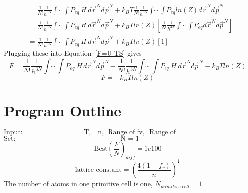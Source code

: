 \documentclass[double,12pt]{beavtex}
\begin{document}
\begin{align}  
    &= \frac{1}{N!}\frac{1}{h^{3N}}\int\dot~\dot~\dot~\int P_{eq}~H~d\vec r^{N} d\vec p^{N} +k_BT\frac{1}{N!}\frac{1}{h^{3N}}\int\dot~\dot~\dot~\int P_{eq}ln(Z)d\vec r^{N} d\vec p^{N}     \\
    &= \frac{1}{N!}\frac{1}{h^{3N}}\int\dot~\dot~\dot~\int P_{eq}~H~d\vec r^{N} d\vec p^{N} +k_BTln(Z)\left[\frac{1}{N!}\frac{1}{h^{3N}}\int\dot~\dot~\dot~\int P_{eq}d\vec r^{N} d\vec p^{N}\right]   \\
    &= \frac{1}{N!}\frac{1}{h^{3N}}\int\dot~\dot~\dot~\int P_{eq}~H~d\vec r^{N} d\vec p^{N} +k_BTln(Z)\left[1\right]   
\end{align}
Plugging these into Equation~\ref{F=U-TS} gives
\begin{equation} F = \frac{1}{N!}\frac{1}{h^{3N}}\int\dot~\dot~\dot~\int P_{eq}~H~d\vec r^{N} d\vec p^{N}-\frac{1}{N!}\frac{1}{h^{3N}}\int\dot~\dot~\dot~\int P_{eq}~H~d\vec r^{N} d\vec p^{N} -k_BTln(Z)\end{equation}
\begin{equation}F = -k_BTln(Z)\end{equation}


\section{Program Outline}

\begin{displaymath}\text{Input:~~~~~~~~~~~~~~~~~~~~~~~~~~~T,~~ n,~~Range of fv,~~Range of gw~~~~~~~~~~~~~~~~~~~~~~~~~~~~~~~~~~~}\end{displaymath} 
\begin{displaymath}\text{Set:~~~~~~~~~~~~~~~~~~~~~~~~~~~~~~~~~~~~~~~~~~~~~~N~=~1~~~~~~~~~~~~~~~~~~~~~~~~~~~~~~~~~~~~~~~~~~~~~~~~~~~~}\end{displaymath} 
\begin{displaymath}\text{Best}\left(\frac{F}{N}\right)_{diff}= 1e100\end{displaymath}
\begin{displaymath}\text{lattice constant}=\left(\frac{4(1-f_v)}{n}\right)^{\frac{1}{3}}\end{displaymath}
The number of atoms in one primitive cell is one, $N_{primitive.cell}=1$. 
\end{document}

